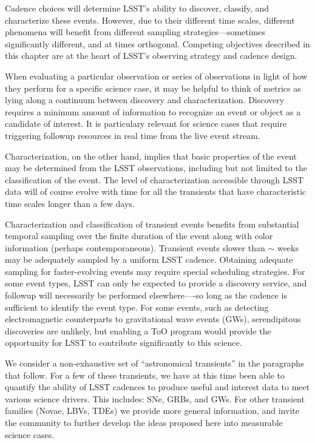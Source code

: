 Cadence choices will determine LSST's ability to discover, classify, and
characterize these events. However, due to their different time scales,
different phenomena will benefit from different sampling
strategies---sometimes
significantly different, and at times orthogonal.  Competing objectives
described in this chapter are at the heart of LSST's observing strategy and
cadence design.

When evaluating a particular observation or series of observations in
light of how they perform for a specific science case, it may be
helpful to think of metrics as lying along a continuum between
discovery and characterization. Discovery requires a minimum amount of
information to recognize an event or object as a candidate of
interest.  It is particulary relevant for science cases that require
triggering followup resources in real time from the live event stream.

Characterization, on the other hand, implies
that basic properties of the event may be determined from the
LSST observations, including but not limited to the classification of
the event. The level of characterization accessible through LSST data
will of course evolve with time for all the transients that have
characteristic time scales longer than a few days.

Characterization and classification of transient events
benefits from substantial temporal sampling over the finite duration of the
event along with color information (perhaps contemporaneous).
Transient events slower than $\sim$ weeks may be adequately sampled by
a uniform LSST cadence.  Obtaining adequate sampling for faster-evolving
events may require special scheduling
strategies.  For some event types, LSST can only be expected to
provide a discovery service, and followup will necessarily be
performed elsewhere----so long as the cadence is sufficient to identify the
event type.
For some events, such as detecting electromagnetic counterparts to
gravitational wave events (GWs),
serendipitous discoveries are unlikely, but
enabling a ToO program would provide the opportunity for LSST to
contribute significantly to this science.


We consider a non-exhaustive set of ``astronomical transients'' in the
paragraphs that follow. For a few of these transients, we have at this time been able to quantify the ability of LSST cadences to produce useful and interest data to meet various science drivers. This includes: SNe, GRBs, and GWs. For other transient families (Novae, LBVs, TDEs) we provide more general information, and invite the community to further develop the ideas proposed here into measurable science cases.

